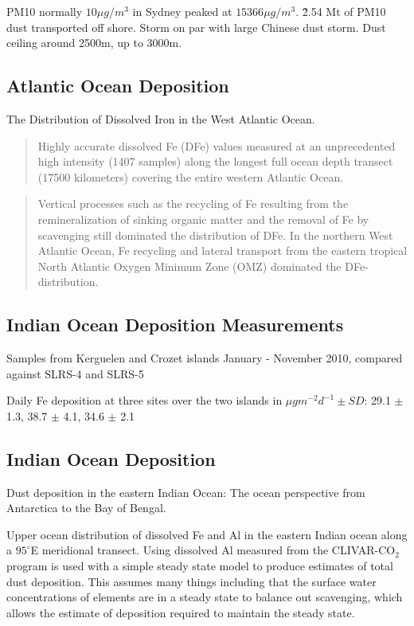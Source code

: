 PM10 normally $10{\mu}g/m^3$ in Sydney peaked at $15366{\mu}g/m^3$.
\~2.54 Mt of PM10 dust transported off shore.
Storm on par with large Chinese dust storm.
Dust ceiling around 2500m, up to 3000m.

\subsection{Atlantic Ocean Deposition \cite{Rijkenberg_2014}}
The Distribution of Dissolved Iron in the West Atlantic Ocean.

\begin{quote}
Highly accurate dissolved Fe (DFe) values measured at an unprecedented high intensity (1407 samples) along the longest full ocean depth transect (17500 kilometers) covering the entire western Atlantic Ocean.
\end{quote}

\begin{quote}
Vertical processes such as the recycling of Fe resulting from the remineralization of sinking organic matter and the removal of Fe by scavenging still dominated the distribution of DFe. In the northern West Atlantic Ocean, Fe recycling and lateral transport from the eastern tropical North Atlantic Oxygen Minimum Zone (OMZ) dominated the DFe-distribution.
\end{quote}

\subsection{Indian Ocean Deposition Measurements \cite{Heimburger_2013}}
Samples from Kerguelen and Crozet islands January - November 2010, compared against SLRS-4 and SLRS-5

Daily Fe deposition at three sites over the two islands in ${\mu}gm^{-2}d^{-1} \pm SD$:
29.1 $\pm$ 1.3, 38.7 $\pm$ 4.1, 34.6 $\pm$ 2.1

\subsection{Indian Ocean Deposition \cite{Grand_2015}}
Dust deposition in the eastern Indian Ocean: The ocean perspective from Antarctica to the Bay of Bengal.

Upper ocean distribution of dissolved Fe and Al in the eastern Indian ocean along a $95^{\circ}$E meridional transect.
Using dissolved Al measured from the CLIVAR-CO$_{2}$ program is used with a simple steady state model to produce estimates of total dust deposition. This assumes many things including that the surface water concentrations of elements are in a steady state to balance out scavenging, which allows the estimate of deposition required to maintain the steady state.

